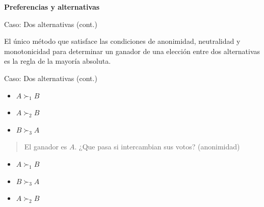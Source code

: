 \documentclass[
  ignorenonframetext,
]{beamer}
\providecommand{\tightlist}{%
  \setlength{\itemsep}{0pt}\setlength{\parskip}{0pt}}\usepackage{longtable,booktabs,array}
\begin{document}
\begin{frame}{\textbf{Preferencias y alternativas}}
\begin{block}{Caso: Dos alternativas (cont.)}
\begin{tcolorbox}[enhanced jigsaw, titlerule=0mm, breakable, colback=white, left=2mm, coltitle=black, toptitle=1mm, leftrule=.75mm, opacityback=0, bottomtitle=1mm, opacitybacktitle=0.6, colbacktitle=quarto-callout-important-color!10!white, title={Teorema de May}, toprule=.15mm, colframe=quarto-callout-important-color-frame, rightrule=.15mm, arc=.35mm, bottomrule=.15mm]

El único método que satisface las condiciones de anonimidad, neutralidad
y monotonicidad para determinar un ganador de una elección entre dos
alternativas es la regla de la mayoría absoluta.

\end{tcolorbox}
\end{block}

\begin{block}{Caso: Dos alternativas (cont.)}
\protect\hypertarget{caso-dos-alternativas-cont.-1}{}
\begin{itemize}
\tightlist
\item
  \(A \succ_{1} B\)
\item
  \(A \succ_{2} B\)
\item
  \(B \succ_{3} A\)
\end{itemize}

\begin{quote}
El ganador es \(A\). ¿Que pasa si intercambian sus votos? (anonimidad)
\end{quote}

\begin{itemize}
\tightlist
\item
  \(A \succ_{1} B\)
\item
  \(B \succ_{3} A\)
\item
  \(A \succ_{2} B\)
\end{itemize}
\end{block}
\end{frame}
\end{document}
